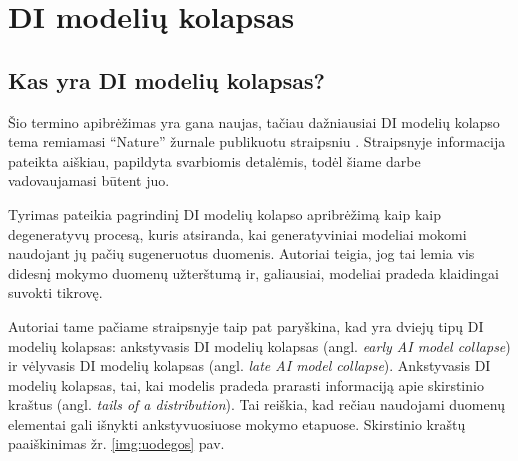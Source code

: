 \documentclass{VUMIFInfKursinis}
\begin{document}
\section{DI modelių kolapsas}


\subsection{Kas yra DI modelių kolapsas?}
Šio termino apibrėžimas yra gana naujas, tačiau dažniausiai DI modelių kolapso tema remiamasi \enquote{Nature} žurnale publikuotu straipsniu \cite{AICollapseNature}. Straipsnyje informacija pateikta aiškiau, papildyta svarbiomis detalėmis, todėl šiame darbe vadovaujamasi būtent juo.

Tyrimas \cite{AICollapseNature} pateikia pagrindinį DI modelių kolapso apribrėžimą kaip kaip degeneratyvų procesą, kuris atsiranda, kai generatyviniai modeliai mokomi naudojant jų pačių sugeneruotus duomenis. Autoriai teigia, jog tai lemia vis didesnį mokymo duomenų užterštumą ir, galiausiai, modeliai pradeda klaidingai suvokti tikrovę.

Autoriai tame pačiame straipsnyje taip pat paryškina, kad yra dviejų tipų DI modelių kolapsas: ankstyvasis DI modelių kolapsas (angl. \textsl{early AI model collapse}) ir vėlyvasis DI modelių kolapsas (angl. \textsl{late AI model collapse}). Ankstyvasis DI modelių kolapsas, tai, kai modelis pradeda prarasti informaciją apie skirstinio kraštus (angl. \textsl{tails of a distribution}). Tai reiškia, kad rečiau naudojami duomenų elementai gali išnykti ankstyvuosiuose mokymo etapuose. Skirstinio kraštų paaiškinimas žr. \ref{img:uodegos} pav. 
\end{document}
